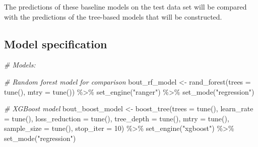 \documentclass[
]{book}
\newenvironment{Shaded}{\begin{snugshade}}{\end{snugshade}}
\newcommand{\AttributeTok}[1]{\textcolor[rgb]{0.77,0.63,0.00}{#1}}
\newcommand{\CommentTok}[1]{\textcolor[rgb]{0.56,0.35,0.01}{\textit{#1}}}
\newcommand{\DecValTok}[1]{\textcolor[rgb]{0.00,0.00,0.81}{#1}}
\newcommand{\FunctionTok}[1]{\textcolor[rgb]{0.00,0.00,0.00}{#1}}
\newcommand{\NormalTok}[1]{#1}
\newcommand{\OtherTok}[1]{\textcolor[rgb]{0.56,0.35,0.01}{#1}}
\newcommand{\SpecialCharTok}[1]{\textcolor[rgb]{0.00,0.00,0.00}{#1}}
\newcommand{\StringTok}[1]{\textcolor[rgb]{0.31,0.60,0.02}{#1}}
\begin{document}
The predictions of these baseline models on the test data set will be compared with the predictions of the tree-based models that will be constructed.

\hypertarget{model-specification}{%
\subsection{Model specification}\label{model-specification}}

\begin{Shaded}
\begin{Highlighting}[]
\CommentTok{\# Models:}

\CommentTok{\# Random forest model for comparison}
\NormalTok{bout\_rf\_model }\OtherTok{\textless{}{-}} \FunctionTok{rand\_forest}\NormalTok{(}\AttributeTok{trees =} \FunctionTok{tune}\NormalTok{(),}
                             \AttributeTok{mtry =} \FunctionTok{tune}\NormalTok{()) }\SpecialCharTok{\%\textgreater{}\%} 
  \FunctionTok{set\_engine}\NormalTok{(}\StringTok{"ranger"}\NormalTok{) }\SpecialCharTok{\%\textgreater{}\%} 
  \FunctionTok{set\_mode}\NormalTok{(}\StringTok{"regression"}\NormalTok{)}

\CommentTok{\# XGBoost model }
\NormalTok{bout\_boost\_model }\OtherTok{\textless{}{-}} \FunctionTok{boost\_tree}\NormalTok{(}\AttributeTok{trees =} \FunctionTok{tune}\NormalTok{(),}
                               \AttributeTok{learn\_rate =} \FunctionTok{tune}\NormalTok{(),}
                               \AttributeTok{loss\_reduction =} \FunctionTok{tune}\NormalTok{(),}
                               \AttributeTok{tree\_depth =} \FunctionTok{tune}\NormalTok{(),}
                               \AttributeTok{mtry =} \FunctionTok{tune}\NormalTok{(),}
                               \AttributeTok{sample\_size =} \FunctionTok{tune}\NormalTok{(),}
                               \AttributeTok{stop\_iter =} \DecValTok{10}\NormalTok{) }\SpecialCharTok{\%\textgreater{}\%}
  \FunctionTok{set\_engine}\NormalTok{(}\StringTok{"xgboost"}\NormalTok{) }\SpecialCharTok{\%\textgreater{}\%} 
  \FunctionTok{set\_mode}\NormalTok{(}\StringTok{"regression"}\NormalTok{)}
\end{Highlighting}
\end{Shaded}
\end{document}
